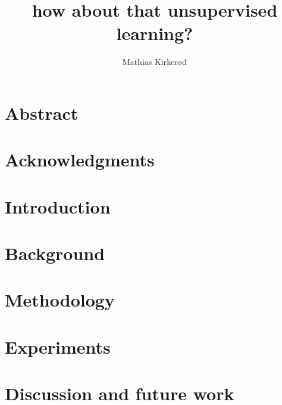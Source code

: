 \documentclass[a4paper,english,twoside,11pt]{ifimaster}
\title{how about that unsupervised learning?}
\author{Mathias Kirker{\o}d}
\begin{document}
\setcounter{hyp}{-1}
\duoforside[dept={Department of Informatics},program={Informatics: Technical and Scientific Applications},long]

\frontmatter{}
\chapter*{Abstract}


\chapter*{Acknowledgments}


\tableofcontents{}
\listoffigures{}
\listoftables{}


\mainmatter{}


\chapter{Introduction} \label{cap:introduction}


\chapter{Background} \label{cap:background}



\chapter{Methodology}\label{cap:methodology}



%

\chapter{Experiments} \label{cap:experiments}



\chapter{Discussion and future work} \label{cap:future}

\end{document}
